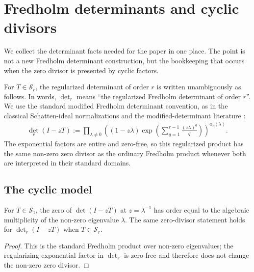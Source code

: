 \section{Fredholm determinants and cyclic divisors}\label{sec:fredholm}

We collect the determinant facts needed for the paper in one place.  The
point is not a new Fredholm determinant construction, but the bookkeeping that
occurs when the zero divisor is presented by cyclic factors.

For \(T\in\mathcal S_r\), the regularized determinant of order \(r\) is written
unambiguously as follows.  In words, \(\det_r\) means ``the regularized
Fredholm determinant of order \(r\)''.  We use the standard modified Fredholm
determinant convention, as in the classical Schatten-ideal normalizations and
the modified-determinant literature
\cite{Simon2005TraceIdeals,GesztesyMakarov2004ModifiedFredholm,GesztesyLatushkinMitreaZinchenko2005,BritzCareyGesztesyNicholsSukochevZanin2021}:
\[
\begin{aligned}
  \det_{r}(I-zT)
  :=
  \prod_{\lambda\ne0}
  \left(
    (1-z\lambda)
    \exp\!\left(\sum_{q=1}^{r-1}\frac{(z\lambda)^q}{q}\right)
  \right)^{a_T(\lambda)} .
\end{aligned}
\]
The exponential factors are entire and zero-free, so this regularized product
has the same non-zero zero divisor as the ordinary Fredholm product whenever
both are interpreted in their standard domains.

\subsection{The cyclic model}

\begin{proposition}
  \label{prop:fredholm-regularized-zero-divisor-correspondence}
  \label{lem:fredholm-spectral-rigidity}
  For \(T\in\mathcal S_1\), the zero of \(\det(I-zT)\) at
  \(z=\lambda^{-1}\) has order equal to the algebraic multiplicity of the
  non-zero eigenvalue \(\lambda\).  The same zero-divisor statement holds for
  \(\det_r(I-zT)\) when \(T\in\mathcal S_r\).
\end{proposition}

\begin{proof}
  This is the standard Fredholm product over non-zero eigenvalues; the
  regularizing exponential factor in \(\det_r\) is zero-free and therefore
  does not change the non-zero zero divisor.
\end{proof}


